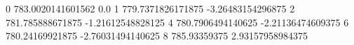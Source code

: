 0 783.0020141601562 0.0
1 779.7371826171875 -3.26483154296875
2 781.785888671875 -1.21612548828125
4 780.7906494140625 -2.21136474609375
6 780.24169921875 -2.76031494140625
8 785.93359375 2.93157958984375
